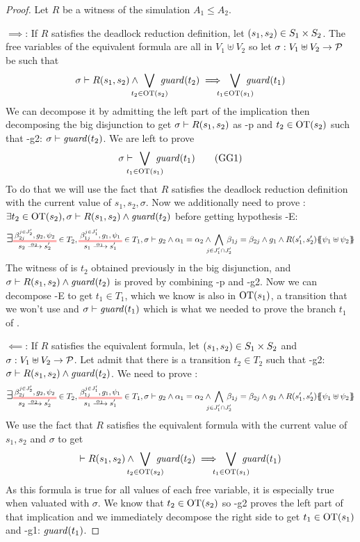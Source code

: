 \documentclass{article}
\begin{document}
\begin{proof} %
Let \(R\) be a witness of the simulation \(A_1 \leq A_2\).
\item[\(\implies\):] If \(R\) satisfies the deadlock reduction definition, let \({\left(s_1, s_2\right)} \in S_1 \times S_2\).
	The free variables of the equivalent formula are all in \(V_1 \uplus V_2\) so let \(\sigma: V_1 \uplus V_2 \to \mathcal{P}\) be such that
	\[ \sigma \vdash R\mpar{s_1, s_2} \wedge \bigvee_\subbox{t_2 \in \fOT{s_2}} \fguard{t_2} \implies \bigvee_\subbox{t_1 \in \fOT{s_1}} \fguard{t_1} \]
	We can decompose it by admitting the left part of the implication then decomposing the big disjunction to get \(\sigma \vdash R{\left(s_1, s_2\right)}\) as \hyp{p} and \(t_2 \in \mathrm{OT}{\left(s_2\right)}\) such that \hyp{g2}: \(\sigma \vdash \mathit{guard}{\left(t_2\right)}\).
	We are left to prove \[ \sigma \vdash \bigvee_\subbox{t_1 \in \fOT{s_1}} \fguard{t_1} \goal{G1} \]
	To do that we will use the fact that \(R\) satisfies the deadlock reduction definition with the current value of \(s_1, s_2, \sigma\).
	Now we additionally need to prove : \(\exists t_2 \in \mathrm{OT}{\left(s_2\right)}, \sigma \vdash R{\left(s_1, s_2\right)} \wedge \mathit{guard}{\left(t_2\right)}\) before getting hypothesis \hyp{E}:
	\[ \bigsymb{\exists} \OTx{2}{}{2}{2} \in T_2, \OTx{1}{}{1}{1} \in T_1, \sigma \vdash g_2 \wedge \alpha_1 = \alpha_2 \wedge \bigwedge_\subbox{j \in J'_1 \cap J'_2} \beta_{1j} = \beta_{2j} \wedge g_1 \wedge R\mpar{s'_1, s'_2}\psubst{\psi_1 \uplus \psi_2} \]
	The witness of  is \(t_2\) obtained previously in the big disjunction, and \(\sigma \vdash R{\left(s_1, s_2\right)} \wedge \mathit{guard}{\left(t_2\right)}\) is proved by combining \hyp{p} and \hyp{g2}.
	Now we can decompose \hyp{E} to get \(t_1 \in T_1\), which we know is also in \(\mathrm{OT}{\left(s_1\right)}\), a transition that we won't use and \(\sigma \vdash \mathit{guard}{\left(t_1\right)}\) which is what we needed to prove the branch \(t_1\) of .
\item[\(\impliedby\):] If \(R\) satisfies the equivalent formula, let \({\left(s_1, s_2\right)} \in S_1 \times S_2\) and \(\sigma: V_1 \uplus V_2 \to \mathcal{P}\).
	Let admit that there is a transition \(t_2 \in T_2\) such that \hyp{g2}: \(\sigma \vdash R{\left(s_1, s_2\right)} \wedge \mathit{guard}{\left(t_2\right)}\).
	We need to prove :
	\[ \bigsymb{\exists} \OTx{2}{}{2}{2} \in T_2, \OTx{1}{}{1}{1} \in T_1, \sigma \vdash g_2 \wedge \alpha_1 = \alpha_2 \wedge \bigwedge_\subbox{j \in J'_1 \cap J'_2} \beta_{1j} = \beta_{2j} \wedge g_1 \wedge R\mpar{s'_1, s'_2}\psubst{\psi_1 \uplus \psi_2} \]
	We use the fact that \(R\) satisfies the equivalent formula with the current value of \(s_1, s_2\) and \(\sigma\) to get
	\[ \vdash R\mpar{s_1, s_2} \wedge \bigvee_\subbox{t_2 \in \fOT{s_2}} \fguard{t_2} \implies \bigvee_\subbox{t_1 \in \fOT{s_1}} \fguard{t_1} \]
	As this formula is true for all values of each free variable, it is especially true when valuated with \(\sigma\).
	We know that \(t_2 \in \mathrm{OT}{\left(s_2\right)}\) so \hyp{g2} proves the left part of that implication and we immediately decompose the right side to get \(t_1 \in \mathrm{OT}{\left(s_1\right)}\) and \hyp{g1}: \(\mathit{guard}{\left(t_1\right)}\).


\end{proof}
\end{document}
